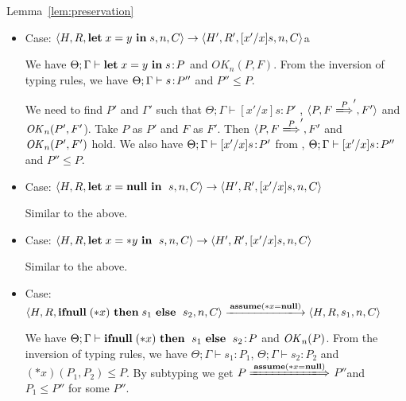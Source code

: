 \begin{pfof}{Lemma~\ref{lem:preservation}}
\begin{itemize}
  We have \(\Theta; \Gamma \vdash *x \leftarrow y : P\) and
  \(\OK_{n}(P, F)\). From the inversion of typing rules, we have \(0 \le
  P\).

  We need to find \(P'\) such that \(\Theta; \Gamma \vdash \SKIP:
  P'\), \( \langle P, F \xLongrightarrow P', F' \rangle \) and
  \(\OK_n(P', F')\). Take \(P\) as \(P'\) and \(F\) as \(F'\). Then,
  \( \langle P, F \xLongrightarrow P', F'\) and \(\OK_n(P', F')\)
  hold. We also have \(\Theta; \Gamma \vdash \SKIP: P'\) from
  , \(0 \le P\) and .

\item Case: \( \langle H, R, \mathbf{let}\; x = y\ \mathbf{in}\; s , n, C \rangle
  \rightarrow \langle H', R', [x'/x]s, n, C \rangle \)a

  We have \(\Theta; \Gamma \vdash \LET x = y \ \IN s \COL P\) and
  \(OK_{n}(P, F)\). From the inversion of typing rules, we have \(\Theta;
  \Gamma \vdash s\!:\! P''\) and \(P'' \le P\).

  We need to find \(P'\) and \(\Gamma'\) such that \(\Theta; \Gamma
  \vdash [x'/x]s : P'\) , \( \langle P, F \xLongrightarrow P', F'
  \rangle\) and \(\mathit{OK}_n(P', F'\)). Take \(P\) as \(P'\) and \(F\) as
  \(F'\). Then \( \langle P,F \xLongrightarrow P', F'\) and
  \(\OK_n(P', F')\) hold.  We also have \(\Theta; \Gamma \vdash
       [x'/x]s\!:\! P'\) from , \(\Theta; \Gamma \vdash
       [x'/x]s\!:\! P''\) and \( P'' \le P\).

\item Case: \( \langle H, R, \LET x = \NULL \ \IN \ s, n, C\rangle
  \rightarrow \langle H', R', [x'/x]s, n, C \rangle \)

  Similar to the above.

\item Case: \( \langle H, R, \mathbf{let}\; x = *y \ \mathbf{in}\; \ s, n, C\rangle
  \rightarrow \langle H', R', [x'/x]s, n, C\rangle \)

  Similar to the above.

\item Case: \(\langle H, R, \IFNULL \Sirx \ \THEN s_{1} \ \ELSE
  \ s_{2}, n, C\rangle \xlongrightarrow{\sassx} \langle H, R, s_{1}, n, C \rangle\)

  We have \(\Theta; \Gamma \vdash \mathbf{ifnull}\; (*x) \ \mathbf{then}\; \ s_{1}
  \ \mathbf{else}\; \ s_{2}\!:\! P\) and \(\mathit{OK}_{n}(P)\). From the inversion of
  typing rules, we have \(\Theta; \Gamma \vdash s_{1} : P_{1}\),
  \(\Theta; \Gamma \vdash s_{2} : P_{2}\) and \( (*x)(P_1,P_2) \le
  P\). By subtyping we get \(P \xLongrightarrow{\sassx} \) \(
  P''\)and \( P_1 \le P''\) for some \( P '' \).


\end{itemize}
\end{pfof}
